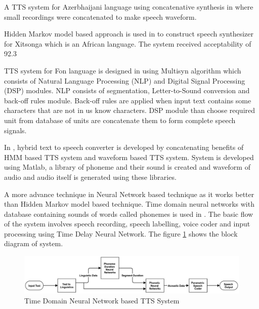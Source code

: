 A TTS system for Azerbhaijani language using concatenative
synthesis in \cite{aida2010main} where small recordings were concatenated to make speech waveform.


Hidden Markov model based approach is used in \cite{baloyi2012text} to construct
speech synthesizer for Xitsonga which is an African language. The system received acceptability
of 92.3%


TTS system for Fon language is designed in \cite{dagba2014text} using Multisyn algorithm
which consists of Natural Language Processing (NLP) and Digital Signal Processing (DSP)
modules. NLP consists of segmentation, Letter-to-Sound conversion and back-off rules module.
Back-off rules are applied when input text contains some characters that are not in us know
characters. DSP module than choose required unit from database of units are concatenate them to
form complete speech signals.


In \cite{ganai2016text}, hybrid text to speech converter is developed by
concatenating benefits of HMM based TTS system and waveform based TTS system. System is
developed using Matlab, a library of phoneme and their sound is created and waveform of audio
and audio itself is generated using these libraries.


A more advance technique in Neural Network based technique as it works better than Hidden
Markov model based technique. Time domain neural networks with
database containing sounds of words called phonemes is used in \cite{karaali1998text}. The basic flow of the system involves
speech recording, speech labelling, voice coder and input processing using Time Delay Neural
Network. The figure \ref{fig:Time Domain Neural Network based TTS System} shows the block diagram of system.

\begin{center}
\begin{figure}[hbtp]
\centering
  \includegraphics[width=\linewidth]{images/time_domain_neural_network.jpg}
  \caption{Time Domain Neural Network based TTS System}
  \label{fig:Time Domain Neural Network based TTS System}
\end{figure}

\end{center}


